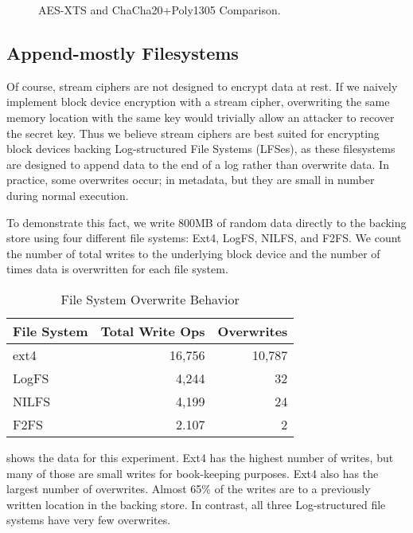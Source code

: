 \begin{figure}[t]
  
\caption{AES-XTS and ChaCha20+Poly1305 Comparison.} \label{fig:motivation}
\end{figure}

\subsection{Append-mostly Filesystems}
Of course, stream ciphers are not designed to encrypt data at rest.
If we naively implement block device encryption with a stream cipher,
overwriting the same memory location with the same key would trivially
allow an attacker to recover the secret key. Thus we believe stream
ciphers are best suited for encrypting block devices backing
Log-structured File Systems (LFSes), as these filesystems are designed
to append data to the end of a log rather than overwrite data. In
practice, some overwrites occur; \eg in metadata, but they are small
in number during normal execution.

To demonstrate this fact, we write 800MB of random data directly to the backing
store using four different file systems: Ext4, LogFS, NILFS, and F2FS. We count
the number of total writes to the underlying block device and the number of
times data is overwritten for each file system.


\begin{table}[th]
\caption{File System Overwrite Behavior} \label{tbl:overwrites}
\footnotesize
\centering
\begin{tabular}{lrr}
  \textbf{File System} & \textbf{Total Write Ops} & \textbf{Overwrites} \\
  \hline
  \hline
  ext4    &  16,756 & 10,787\\
  LogFS   &   4,244 &     32\\
  NILFS   &   4,199 &     24\\
  F2FS    &   2.107 &      2\\
  \hline 
  \hline
\end{tabular}
\end{table}

 shows the data for this experiment. Ext4 has the highest
number of writes, but many of those are small writes for book-keeping purposes.
Ext4 also has the largest number of overwrites. Almost 65\% of the writes are to
a previously written location in the backing store. In contrast, all three
Log-structured file systems have very few overwrites.

